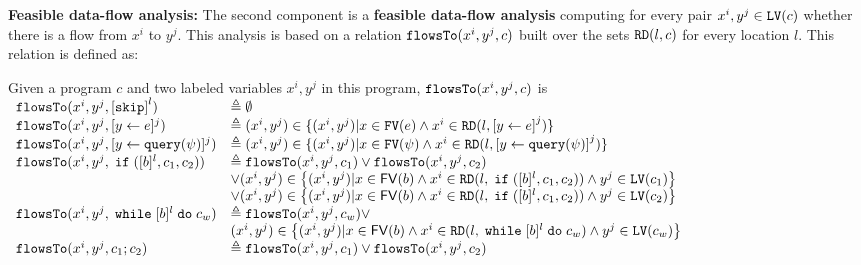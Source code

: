 \noindent\textbf{Feasible data-flow analysis:} The second component is a \textbf{feasible data-flow analysis} computing for every pair $x^i, y^j \in \mathtt{LV}(c)$ whether there is a flow from $x^i$ to $y^j$. This analysis is based on a relation $\mathtt{flowsTo}(x^i, y^j, c)$ built over the sets $\mathtt{RD}(l, c)$ for every location $l$. This relation is defined  as:
\begin{defn}
  \label{def:feasible_flowsto}
  Given a program $c$ and two labeled variables $x^i, y^j$  in this program, 
  $\mathtt{flowsTo}(x^i, y^j, c)$ is 
  \\
    {\footnotesize
$  \begin{array}{ll}
  \flowsto(x^i, y^j, \clabel{\eskip}^{l}) 
  &\triangleq \emptyset \\
  \flowsto(x^i, y^j, \clabel{\assign{y}{\expr}}{}^j) 
  & \triangleq (x^i, y^j) \in \{ (x^i, y^j) | x \in \kw{FV}(\expr) 
  \land x^i \in \live(l, \clabel{\assign{y}{\expr}}^j) \} \\
  \flowsto(x^i, y^j, \clabel{\assign{y}{\query(\qexpr)}}{}^j) 
  & \triangleq (x^i, y^j) \in \{ (x^i, y^j) | x \in \kw{FV}(\qexpr) 
  \land x^i \in \live(l,\clabel{\assign{y}{\query(\qexpr)}}^j) \} \\
    \flowsto(x^i, y^j, \eif ([b]^l, c_1, c_2))  & \triangleq \flowsto(x^i, y^j, c_1) \lor \flowsto(x^i, y^j, c_2) \\ 
        & \lor (x^i, y^j) \in
        \left\{(x^i,y^j) | x \in \mathsf{FV}(b) \land 
      x^i \in \live(l, \eif ([b]^l, c_1, c_2)) \land  y^j \in \lvar(c_1) \right\} \\
       &\lor (x^i, y^j) \in \left\{(x^i,y^j) | x \in \mathsf{FV}(b) \land 
      x^i\in \live(l, \eif ([b]^l, c_1, c_2))  \land  y^j \in \lvar(c_2)  \right\} \\
       \flowsto(x^i, y^j, \ewhile [b]^l \edo c_w)  & \triangleq  \flowsto(x^i, y^j, c_w)  \lor
       \\ & 
       (x^i, y^j) \in  \left\{(x^i,y^j) | x \in \mathsf{FV}(b) \land 
      x^i \in \live(l,   \ewhile [b]^l \edo c_w) \land  y^j \in \lvar(c_w) \right\} \\
       \flowsto(x^i, y^j, c_1 ;c_2)  & \triangleq \flowsto(x^i, y^j, c_1) \lor \flowsto(x^i, y^j, c_2) \\
   \end{array}$
   }
   \end{defn}
